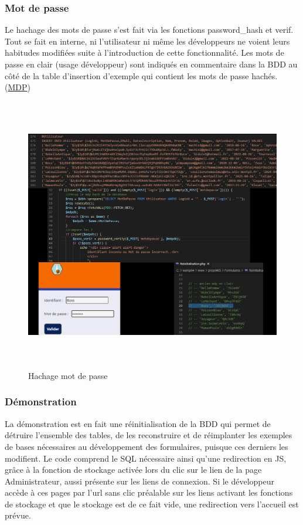 \documentclass[12pt]{report}
\begin{document}
       \subsubsection{Mot de passe}
\par                
Le hachage des mots de passe s’est fait via les fonctions password\_hash et verif. Tout se fait en interne, ni l’utilisateur ni même les développeurs ne voient leurs habitudes modifiées suite à l’introduction de cette fonctionnalité. Les mots de passe en clair (usage développeur) sont indiqués en commentaire dans la BDD au côté de la table d’insertion d’exemple qui contient les mots de passe hachés. (\hyperlink{fig-mdp}{MDP})
 \begin{figure}[h]
 \hypertarget{fig-mdp}{}
			\centering
				\includegraphics[height=12cm]{figures/pt-mdp.png}
			\caption{Hachage mot de passe}
\end{figure}
        \subsubsection{Démonstration}
\par                
La démonstration est en fait une réinitialisation de la BDD qui permet de détruire l’ensemble des tables, de les reconstruire et de réimplanter les exemples de bases nécessaires au développement des formulaires, puisque ces derniers les modifient. Le code comprend le SQL nécessaire ainsi qu’une redirection en JS, grâce à la fonction de stockage activée lors du clic sur le lien de la page Administrateur, aussi présente sur les liens de connexion. Si le développeur accède à ces pages par l’url sans clic préalable sur les liens activant les fonctions de stockage et que le stockage est de ce fait vide, une redirection vers l’accueil est prévue.
  
\end{document}
